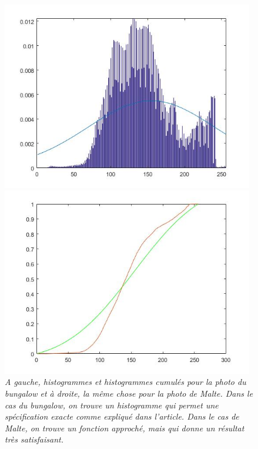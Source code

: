 \documentclass{article}
\begin{document}
\begin{figure}[!hbt]
\begin{minipage}{0.25\textwidth}
\end{minipage}%
\begin{minipage}{0.25\textwidth}
\centering
\includegraphics[width=0.98\textwidth]{images/p3_malta_hist.jpg}
\end{minipage}%
\begin{minipage}{0.25\textwidth}
\centering
\includegraphics[width=0.98\textwidth]{images/p3_malta_cumsum.jpg}
\end{minipage}
\caption{\textit{A gauche, histogrammes et histogrammes cumulés pour la photo du bungalow et à droite, la même chose pour la photo de Malte. Dans le cas du bungalow, on trouve un histogramme qui permet une spécification exacte comme expliqué dans l'article. Dans le cas de Malte, on trouve un fonction approché, mais qui donne un résultat très satisfaisant.}}
\label{fig:histograms}
\end{figure}
\FloatBarrier
\end{document}
